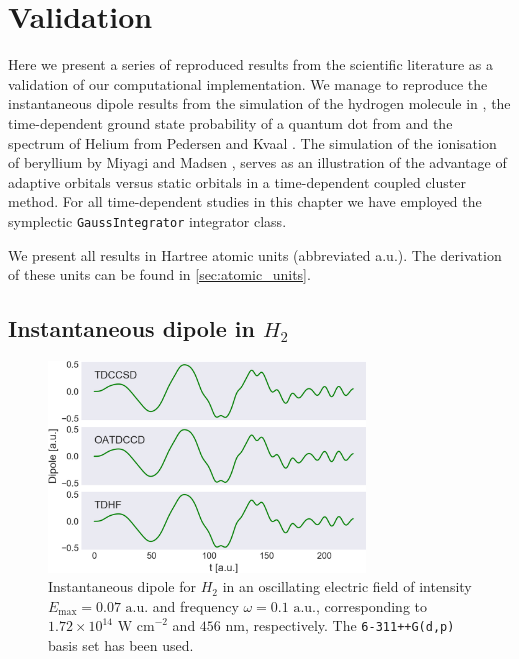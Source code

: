 \chapter{Validation}
\label{ch:validation}

Here we present a series of reproduced results from the scientific literature as 
a validation of our computational implementation. We manage to reproduce the 
instantaneous dipole results from the simulation of the 
hydrogen molecule in \citeauthor{li2005time} \cite{li2005time},
the time-dependent ground state probability of a quantum dot from 
\citeauthor{Zanghellini04} \cite{Zanghellini04}
and the spectrum of Helium from
Pedersen and Kvaal \cite{pedersen2019symplectic}.
The simulation of the ionisation of beryllium 
by Miyagi and Madsen \cite{miyagi2013time},
serves as an illustration of the advantage of
adaptive orbitals versus static orbitals in a time-dependent coupled cluster method.
For all time-dependent studies in this chapter we have employed the symplectic 
\lstinline{GaussIntegrator} integrator class.

We present all results in Hartree atomic units (abbreviated a.u.). The derivation of these
units can be found in \autoref{sec:atomic_units}.


\section{Instantaneous dipole in $H_2$}

\begin{figure}
    \centering
    \includegraphics[width=0.75\textwidth]{results/figures/li_compare.png}
    \caption{Instantaneous dipole for $H_2$ in an oscillating electric field
        of intensity $E_\text{max} = 0.07 \text{ a.u.}$ 
        and frequency $\omega=0.1 \text{ a.u.}$, corresponding to
        $1.72\times10^14 \text{ W cm}^{-2}$ and $456\text{ nm}$, respectively.
        The \lstinline{6-311++G(d,p)}
        basis set has been used.
    }
    \label{fig:li_compare}
\end{figure}

